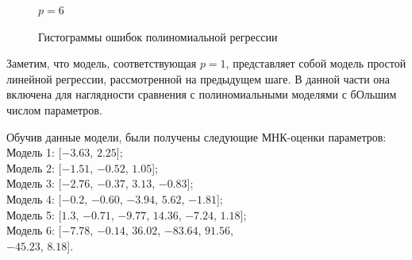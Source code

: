 \documentclass[a4paper,12pt]{article}
\begin{document}
\begin{figure}
\begin{minipage}[H]{0.47\linewidth}
    \end{minipage}
    \hfill
    \begin{minipage}[H]{0.47\linewidth}
         $p=6$ \\
    \end{minipage}
    \caption{Гистограммы ошибок полиномиальной регрессии}
    \label{poly_hist_errors}
\end{figure}

Заметим, что модель, соответствующая $p=1$, представляет собой модель простой линейной регрессии, рассмотренной на предыдущем шаге. В данной части она включена для наглядности сравнения с полиномиальными моделями с бОльшим числом параметров.

Обучив данные модели, были получены следующие МНК-оценки параметров:\\
Модель 1: [$-3.63$, $2.25$];\\
Модель 2: [$-1.51$, $-0.52$, $1.05$];\\
Модель 3: [$-2.76$, $-0.37$, $3.13$, $-0.8$3];\\
Модель 4: [$-0.2$, $-0.60$, $-3.94$, $5.62$, $-1.81$];\\
Модель 5: [$1.3$, $-0.71$, $-9.77$, $14.36$, $-7.24$, $1.18$];\\
Модель 6: [$-7.78$, $-0.14$, $36.02$, $-83.64$, $91.56$,\\
    $-45.23$, $8.18$].\\\newline
\end{document}
